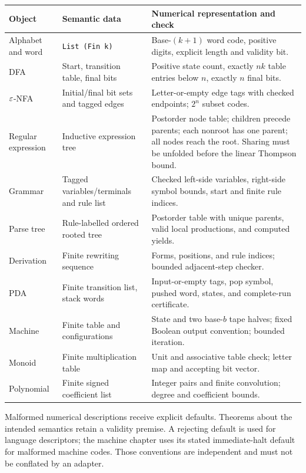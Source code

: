 \begin{longtable}{@{}p{}p{}p{}@{}}
\toprule
Object & Semantic data & Numerical representation and check\\
\midrule\endhead
Alphabet and word & \texttt{List (Fin k)} & Base-$(k+1)$ word code,
positive digits, explicit length and validity bit.\\
DFA & Start, transition table, final bits & Positive state count, exactly
$nk$ table entries below $n$, exactly $n$ final bits.\\
$\varepsilon$-NFA & Initial/final bit sets and tagged edges & Letter-or-empty
edge tags with checked endpoints; $2^n$ subset codes.\\
Regular expression & Inductive expression tree & Postorder node table;
children precede parents; each nonroot has one parent; all nodes reach
the root. Sharing must be unfolded before the linear Thompson bound.\\
Grammar & Tagged variables/terminals and rule list & Checked left-side
variables, right-side symbol bounds, start and finite rule indices.\\
Parse tree & Rule-labelled ordered rooted tree & Postorder table with
unique parents, valid local productions, and computed yields.\\
Derivation & Finite rewriting sequence & Forms, positions, and rule
indices; bounded adjacent-step checker.\\
PDA & Finite transition list, stack words & Input-or-empty tags,
pop symbol, pushed word, states, and complete-run certificate.\\
Machine & Finite table and configurations & State and two base-$b$ tape
halves; fixed Boolean output convention; bounded iteration.\\
Monoid & Finite multiplication table & Unit and associative table check;
letter map and accepting bit vector.\\
Polynomial & Finite signed coefficient list & Integer pairs and finite
convolution; degree and coefficient bounds.\\
\bottomrule
\end{longtable}

Malformed numerical descriptions receive explicit defaults. Theorems about
the intended semantics retain a validity premise. A rejecting default is
used for language descriptors; the machine chapter uses its stated
immediate-halt default for malformed machine codes. Those conventions
are independent and must not be conflated by an adapter.

